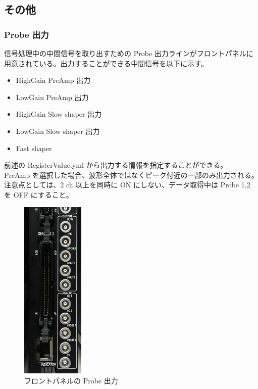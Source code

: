 
\subsection{その他}

\subsubsection{Probe 出力}


\begin{multicols}{2}
信号処理中の中間信号を取り出すための Probe 出力ラインがフロントパネルに用意されている。出力することができる中間信号を以下に示す。
\begin{itemize}
\item HighGain PreAmp 出力
\item LowGain PreAmp 出力
\item HighGain Slow shaper 出力
\item LowGain Slow shaper 出力
\item Fast shaper
\end{itemize}
前述の RegisterValue.yml から出力する情報を指定することができる。\\

PreAmp を選択した場合、波形全体ではなくピーク付近の一部のみ出力される。注意点としては、2 ch 以上を同時に ON にしない、データ取得中は Probe 1,2 を OFF にすること。


\begin{figure}[H]
\begin{center}
\includegraphics[width = 3cm, bb= 0 0 602 1750]{6.jpg}
\end{center}
\caption{フロントパネルの Probe 出力}
\label{fig:}
\end{figure}
\end{multicols}


